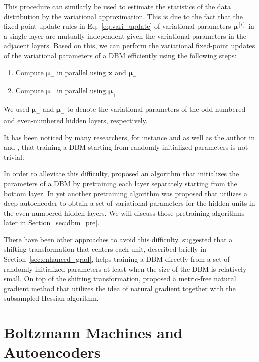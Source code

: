 \documentclass[dissertation,nocontribution,draft*]{aaltoseries}
\newcommand{\qlay}[1]{\left[#1\right]}
\newcommand{\vect}[1]{\mathbf{#1}}
\newcommand{\vects}[1]{\boldsymbol{#1}}
\newcommand{\vx}[0]{\vect{x}}
\newcommand{\vmu}[0]{\vects{\mu}}
\begin{document}
This procedure can similarly be used to estimate the
statistics of the data distribution by the variational
approximation. This is due to the fact that the fixed-point
update rules in Eq.~\eqref{eq:vari_update} of variational
parameters $\vmu^{\qlay{l}}$ in a single layer are mutually
independent given the variational parameters in the adjacent
layers. Based on this, we can perform the variational
fixed-point updates of the variational parameters of a DBM
efficiently using the following steps:
\begin{enumerate}
    \itemsep 0em
    \item Compute $\vmu_+$ in parallel using $\vx$ and $\vmu_-$
    \item Compute $\vmu_-$ in parallel using $\vmu_+$
\end{enumerate}
We used $\vmu_+$ and $\vmu_-$ to denote the variational
parameters of the odd-numbered and even-numbered hidden
layers, respectively.

It has been noticed by many researchers, for instance
\citet{Salakhutdinov2009a} and \citet{Desjardins2012} as
well as the author in  and
, that training
a DBM starting from randomly initialized parameters is not
trivial. 

In order to alleviate this difficulty,
\citet{Salakhutdinov2009a,Salakhutdinov2012} proposed an
algorithm that initializes the parameters of a DBM by
pretraining each layer separately starting from the bottom
layer. In  yet another pretraining
algorithm was proposed that utilizes a deep autoencoder to
obtain a set of variational parameters for the hidden units
in the even-numbered hidden layers.  We will discuss those
pretraining algorithms later in Section~\ref{sec:dbm_pre}.

There have been other approaches to avoid this difficulty.
\citet{Montavon2012} suggested that a shifting
transformation that centers each unit, described briefly in
Section~\ref{sec:enhanced_grad}, helps training a
DBM directly from a set of randomly initialized parameters
at least when the size of the DBM is relatively small.  On
top of the shifting transformation, \citet{Desjardins2013}
proposed a metric-free natural gradient method that utilizes
the idea of natural gradient together with the subsampled
Hessian algorithm. 



\section{Boltzmann Machines and Autoencoders}
\label{sec:bm_aenc}
\end{document}
